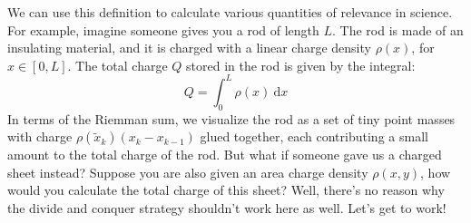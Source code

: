 We can use this definition to calculate various quantities of relevance in science. For example, imagine someone gives you a rod of length $L$. The rod is made of an insulating material, and it is charged with a linear charge density $\rho(x)$, for $x \in [0, L]$. The total charge $Q$ stored in the rod is given by the integral:
\begin{equation}
    Q = \int_0^L \rho(x) \ \mathrm{d} x
\end{equation}
In terms of the Riemman sum, we visualize the rod as a set of tiny point masses with charge $\rho(\tilde{x}_k) (x_k - x_{k-1})$ glued together, each contributing a small amount to the total charge of the rod. But what if someone gave us a charged sheet instead? Suppose you are also given an area charge density $\rho(x,y)$, how would you calculate the total charge of this sheet? Well, there's no reason why the divide and conquer strategy shouldn't work here as well. Let's get to work!

